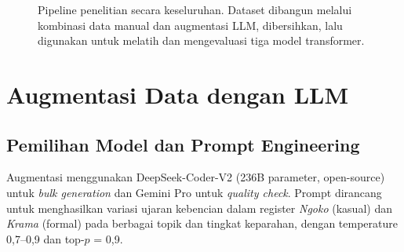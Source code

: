 \documentclass[10pt,twocolumn]{article}
\begin{document}
\begin{figure}[H]
\centering
{}
\caption{Pipeline penelitian secara keseluruhan. Dataset dibangun melalui kombinasi data manual dan augmentasi LLM, dibersihkan, lalu digunakan untuk melatih dan mengevaluasi tiga model transformer.}
\label{fig:pipeline}
\end{figure}

\section{Augmentasi Data dengan LLM}

\subsection{Pemilihan Model dan Prompt Engineering}

Augmentasi menggunakan DeepSeek-Coder-V2 (236B parameter, open-source) untuk \textit{bulk generation} dan Gemini Pro untuk \textit{quality check}. Prompt dirancang untuk menghasilkan variasi ujaran kebencian dalam register \textit{Ngoko} (kasual) dan \textit{Krama} (formal) pada berbagai topik dan tingkat keparahan, dengan temperature 0,7--0,9 dan top-$p$ = 0,9.
\end{document}
